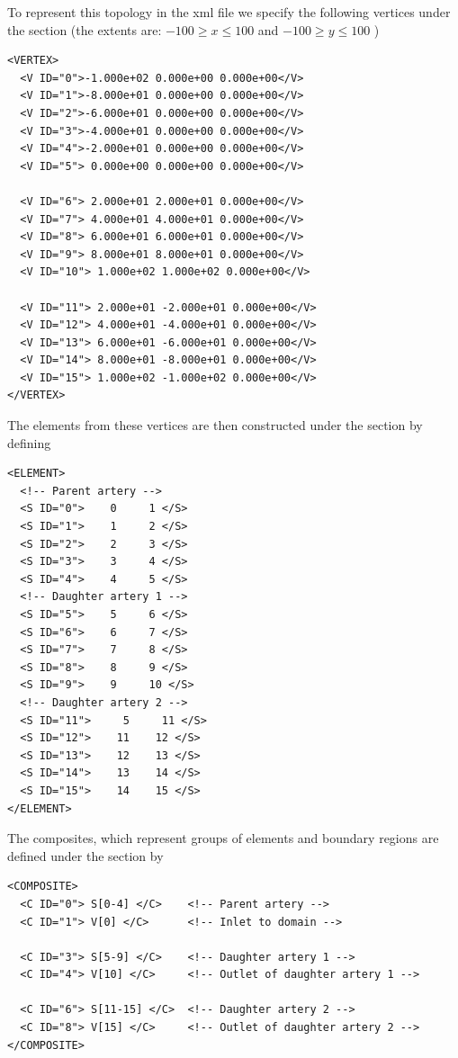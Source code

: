 To represent this topology in the xml file we specify the following vertices under the section  (the extents are: $-100 \geq x \leq 100$ and $-100 \geq y \leq 100$ )

\begin{lstlisting}[style=XmlStyle]        
<VERTEX>
  <V ID="0">-1.000e+02 0.000e+00 0.000e+00</V>
  <V ID="1">-8.000e+01 0.000e+00 0.000e+00</V>
  <V ID="2">-6.000e+01 0.000e+00 0.000e+00</V>
  <V ID="3">-4.000e+01 0.000e+00 0.000e+00</V>
  <V ID="4">-2.000e+01 0.000e+00 0.000e+00</V>
  <V ID="5"> 0.000e+00 0.000e+00 0.000e+00</V>
      
  <V ID="6"> 2.000e+01 2.000e+01 0.000e+00</V>
  <V ID="7"> 4.000e+01 4.000e+01 0.000e+00</V>
  <V ID="8"> 6.000e+01 6.000e+01 0.000e+00</V>
  <V ID="9"> 8.000e+01 8.000e+01 0.000e+00</V>
  <V ID="10"> 1.000e+02 1.000e+02 0.000e+00</V>
            
  <V ID="11"> 2.000e+01 -2.000e+01 0.000e+00</V>
  <V ID="12"> 4.000e+01 -4.000e+01 0.000e+00</V>
  <V ID="13"> 6.000e+01 -6.000e+01 0.000e+00</V>
  <V ID="14"> 8.000e+01 -8.000e+01 0.000e+00</V>
  <V ID="15"> 1.000e+02 -1.000e+02 0.000e+00</V>
</VERTEX>
\end{lstlisting}

The elements from these vertices are then constructed under the section  by defining 
\begin{lstlisting}[style=XmlStyle]
<ELEMENT>
  <!-- Parent artery -->
  <S ID="0">    0     1 </S>
  <S ID="1">    1     2 </S>
  <S ID="2">    2     3 </S>
  <S ID="3">    3     4 </S>
  <S ID="4">    4     5 </S>
  <!-- Daughter artery 1 -->    
  <S ID="5">    5     6 </S>
  <S ID="6">    6     7 </S>
  <S ID="7">    7     8 </S>
  <S ID="8">    8     9 </S>
  <S ID="9">    9     10 </S>
  <!-- Daughter artery 2 -->    
  <S ID="11">     5     11 </S>
  <S ID="12">    11    12 </S>
  <S ID="13">    12    13 </S>
  <S ID="14">    13    14 </S>
  <S ID="15">    14    15 </S>
</ELEMENT>
\end{lstlisting}

The composites, which represent groups of elements and boundary regions are defined under the section  by
\begin{lstlisting}[style=XmlStyle]
<COMPOSITE>
  <C ID="0"> S[0-4] </C>	<!-- Parent artery -->
  <C ID="1"> V[0] </C>		<!-- Inlet to domain -->
      
  <C ID="3"> S[5-9] </C>	<!-- Daughter artery 1 -->
  <C ID="4"> V[10] </C>		<!-- Outlet of daughter artery 1 -->
      
  <C ID="6"> S[11-15] </C>	<!-- Daughter artery 2 -->
  <C ID="8"> V[15] </C>		<!-- Outlet of daughter artery 2 -->
</COMPOSITE>
\end{lstlisting}

